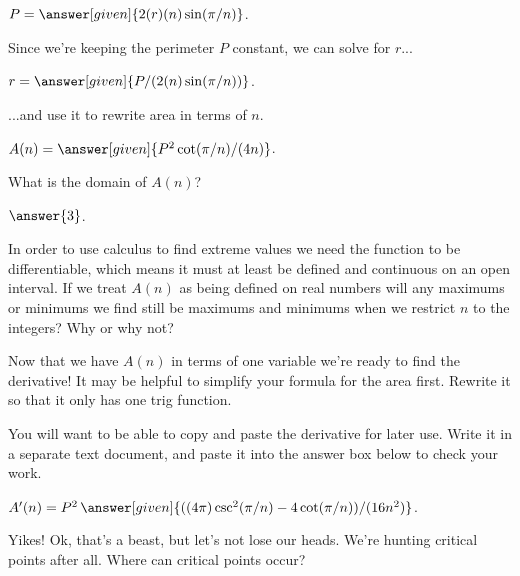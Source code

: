\documentclass[handout,nooutcomes]{ximera}
\begin{document}
\begin{problem}
$P = \answer[given]{2(r)(n)\sin(\pi/n)}$.

Since we're keeping the perimeter $P$ constant, we can solve for $r$...

$r = \answer[given]{P/(2(n)\sin(\pi/n))}$.

...and use it to rewrite area in terms of $n$.

$A(n) = \answer[given]{P^2\cot(\pi/n)/(4n)}$.

\bigskip

What is the domain of $A(n)$? 

  $\answer{3}$.

\begin{freeResponse}
In order to use calculus to find extreme values we need the function to be differentiable, which means it must at least be defined and continuous on an open interval. If we treat $A(n)$ as being defined on real numbers will any maximums or minimums we find still be maximums and minimums when we restrict $n$ to the integers? Why or why not?
\end{freeResponse}

\bigskip

\hspace{2cm}Now that we have $A(n)$ in terms of one variable we're ready to find the derivative! It may be helpful to simplify your formula for the area first. Rewrite it so that it only has one trig function.

You will want to be able to copy and paste the derivative for later use. Write it in a separate text document, and paste it into the answer box below to check your work.

$A'(n) = P^2\,\answer[given]{((4\pi)\csc^2(\pi/n)-4\cot(\pi/n))/(16n^2)}$.

\end{problem}

\bigskip

\begin{problem}
\hspace{2cm}Yikes! Ok, that's a beast, but let's not lose our heads. We're hunting critical points after all. Where can critical points occur?
\begin{selectAll}
\end{selectAll}
\end{problem}
\end{document}
